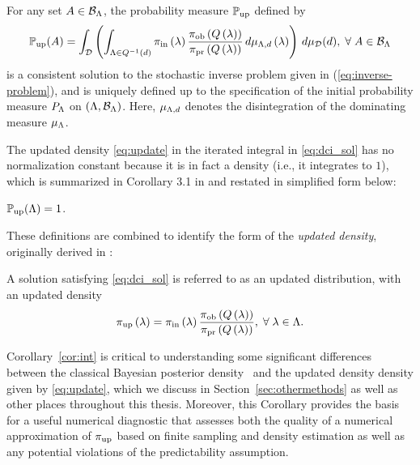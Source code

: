 \begin{thm}
  For any set $A\in \mathcal{B}_{{\Lambda}}$, the probability measure $\operatorname*{\mathbb{P}_{up}}$ defined by
  \begin{equation}\label{eq:dci_sol}
    \operatorname*{\mathbb{P}_{up}} (A) = \int_{\mathcal{D}} \left (  \int_{{\Lambda} \in Q^{-1}(d)}  \operatorname*{\pi_{in}}\left ( \lambda \right ) \frac{\operatorname*{\pi_{ob}}\left ( Q\left ( \lambda \right ) \right )}{\operatorname*{\pi_{pr}}\left ( Q\left ( \lambda \right ) \right )} \, d\mu_{{\Lambda}, d} \left ( \lambda \right ) \right ) \, d\mu_{\mathcal{D}}(d), \; \forall \; A \in \mathcal{B}_{{\Lambda}}
  \end{equation}
  is a consistent solution to the stochastic inverse problem given in (\ref{eq:inverse-problem}), and is uniquely defined up to the specification of the initial probability measure $P_{\Lambda}$ on $({\Lambda}, \mathcal{B}_{{\Lambda}})$.
  Here, $\mu_{{\Lambda}, d}$ denotes the disintegration of the dominating measure $\mu_{\Lambda}$.
\end{thm}

The updated density \eqref{eq:update} in the iterated integral in \eqref{eq:dci_sol} has no normalization constant because it is in fact a density (i.e., it integrates to $1$), which is summarized in Corollary 3.1 in \cite{BJW18} and restated in simplified form below:
\begin{cor}\label{cor:int}
$\operatorname*{\mathbb{P}_{up}}({\Lambda}) = 1$.
\end{cor}

These definitions are combined to identify the form of the \emph{updated density}, originally derived in \cite{BJW18}:

\begin{defn}\label{defn:updated}
  A solution satisfying \eqref{eq:dci_sol} is referred to as an updated distribution, with an updated density
  \begin{equation}\label{eq:update}
    \operatorname*{\pi_{up}} \left ( \lambda \right ) = \operatorname*{\pi_{in}} \left ( \lambda \right ) \frac{\operatorname*{\pi_{ob}} \left ( Q\left ( \lambda \right ) \right ) }{\operatorname*{\pi_{pr}} \left ( Q\left ( \lambda \right ) \right ) }, \; \forall \; \lambda \in {\Lambda}.
  \end{equation}
\end{defn}

Corollary~\ref{cor:int} is critical to understanding some significant differences between the classical Bayesian posterior density~\cite{Smith} and the updated density density given by \eqref{eq:update}, which we discuss in Section~\ref{sec:othermethods} as well as other places throughout this thesis.
Moreover, this Corollary provides the basis for a useful numerical diagnostic that assesses both the quality of a numerical approximation of $\operatorname*{\pi_{up}}$ based on finite sampling and density estimation as well as any potential violations of the predictability assumption.

